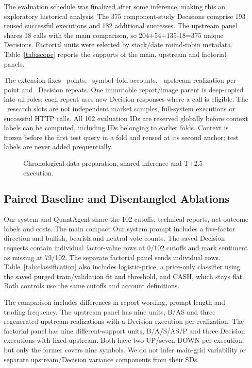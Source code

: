 The evaluation schedule was finalized after some inference, making this an exploratory historical analysis. The 375 component-study Decisions comprise 193 reused successful executions and 182 additional successes. The upstream panel shares 18 calls with the main comparison, so 204+54+135-18=375 unique Decisions. Factorial units were selected by stock/date round-robin metadata. Table~\ref{tab:scope} reports the supports of the main, upstream and factorial panels.



The extension fixes \UnifiedPoints\ points, \UnifiedAccounts\ symbol--fold accounts, \UnifiedUpstreamRealizations\ upstream realization per point and \UnifiedDecisionRepeats\ Decision repeats. One immutable report/image parent is deep-copied into all roles; each repeat uses new Decision responses where a call is eligible. The \UnifiedForecastSlots\ research slots are not independent market samples, full-system executions or successful HTTP calls. All 102 evaluation IDs are reserved globally before context labels can be computed, including IDs belonging to earlier folds. Context is frozen before the first test query in a fold and reused at its second anchor; test labels are never added prequentially.


\begin{figure}[!htb]
\centering
\caption{Chronological data preparation, shared inference and T+2.5 execution.}
\label{fig:walkforward}
\end{figure}

\subsection{Paired Baseline and Disentangled Ablations}
Our system and QuantAgent share the 102 cutoffs, technical reports,
net outcome labels and costs. The main compact Our system prompt includes
a five-factor direction and bullish, bearish and neutral vote counts.
The saved Decision requests contain individual factor-value rows at
0/102 cutoffs and mark sentiment as missing at 79/102. The separate
factorial panel sends individual rows. Table~\ref{tab:classification}
also includes logistic-price, a price-only classifier using the saved
purged train/validation fit and threshold, and CASH, which stays flat.
Both controls use the same cutoffs and account definitions.

The comparison includes differences in report wording, prompt length and trading frequency. The upstream panel has nine units, B/AS and three regenerated upstream realizations with a Decision execution per realization. The factorial panel has nine different-support units, B/A/S/AS/P and three Decision executions with fixed upstream. Both have two UP/seven DOWN per execution, but only the former covers nine symbols. We do not infer main-grid variability or separate upstream/Decision variance components from their SDs.

